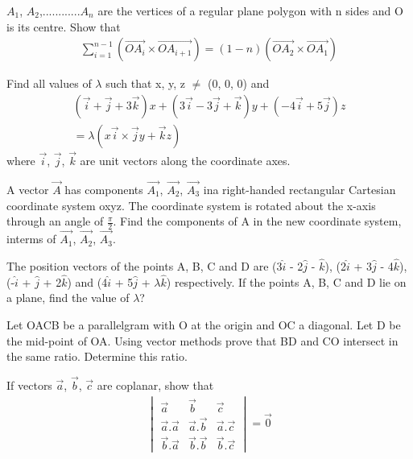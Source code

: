 \item $A_1$, $A_2$,............$A_n$ are the vertices of a regular plane polygon with n sides and O is its centre. Show that 
\begin{align*}
\sum_{i=1}^{n-1} (\overrightarrow{OA_{i}} \times \overrightarrow{OA_{i+1}}) = (1-n)(\overrightarrow{OA_{2}} \times \overrightarrow{OA_{1}})
\end{align*}

\item Find all values of $\lambda$ such that x, y, z $\neq$ (0, 0, 0) and 
\begin{align*}
(\overrightarrow{i} + \overrightarrow{j} + 3\overrightarrow{k})x + (3\overrightarrow{i} - 3\overrightarrow{j} + \overrightarrow{k})y + (-4\overrightarrow{i} + 5\overrightarrow{j})z\\
 = \lambda(x\overrightarrow{i} \times \overrightarrow{j}y + \overrightarrow{k}z)
\end{align*}
where $\overrightarrow{i}$, $\overrightarrow{j}$, $\overrightarrow{k}$ are unit vectors along the coordinate axes.

\item A vector $\overrightarrow{A}$ has components $\overrightarrow{A_1}$, $\overrightarrow{A_2}$, $\overrightarrow{A_3}$ ina right-handed rectangular Cartesian coordinate system oxyz. The coordinate system is rotated about the x-axis through an angle of $\frac{\pi}{2}$. Find the components of A in the new coordinate system, interms of $\overrightarrow{A_1}$, 
$\overrightarrow{A_2}$, $\overrightarrow{A_3}$.

\item The position vectors of the points A, B, C and D are (3$\hat{i}$ - 2$\hat{j}$ - $\hat{k}$), (2$\hat{i}$ + 3$\hat{j}$ - 4$\hat{k}$), (-$\hat{i}$ + $\hat{j}$ + 2$\hat{k}$) and (4$\hat{i}$ + 5$\hat{j}$ + $\lambda\hat{k}$) respectively. If the points A, B, C and D lie on a plane, find the value of $\lambda$?

\item Let OACB be a parallelgram with O at the origin and OC a diagonal. Let D be the mid-point of OA. Using vector methods prove that BD and CO intersect in the same ratio. Determine this ratio.

\item If vectors $\overrightarrow{a}$, $\overrightarrow{b}$, $\overrightarrow{c}$ are coplanar, show that
\begin{align*}
\begin{vmatrix}
\overrightarrow{a} & \overrightarrow{b} & \overrightarrow{c} \\ 
\overrightarrow{a} . \overrightarrow{a} & \overrightarrow{a} . \overrightarrow{b} & \overrightarrow{a} . \overrightarrow{c} \\ 
\overrightarrow{b} . \overrightarrow{a} & \overrightarrow{b} . \overrightarrow{b} & \overrightarrow{b} . \overrightarrow{c}
\end{vmatrix} = \overrightarrow{0}
\end{align*}


